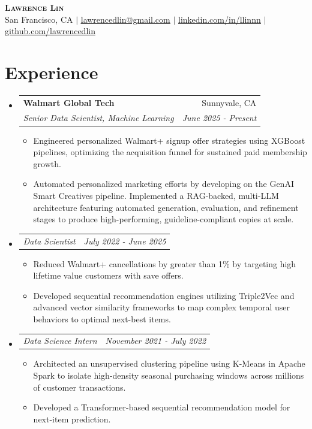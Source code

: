 \documentclass[letterpaper,11pt]{article}
\makeatletter
\newcommand{\resumeItem}[1]{
  \item\small{
    {#1 \vspace{-2pt}}
  }
}
\newcommand{\resumeSubheading}[4]{
  \vspace{-2pt}\item
    \begin{tabular*}{0.97\textwidth}[t]{l@{\extracolsep{\fill}}r}
      \textbf{#1} & #2 \\
      \textit{\small#3} & \textit{\small #4} \\
    \end{tabular*}\vspace{-8pt}
}
\newcommand{\resumeSubHeadingListStart}{\begin{itemize}[leftmargin=0.15in, label={}]}
\newcommand{\resumeSubHeadingListEnd}{\end{itemize}}
\newcommand{\resumeItemListStart}{\begin{itemize}}
\newcommand{\resumeItemListEnd}{\end{itemize}\vspace{-5pt}}
\newcommand{\resumeSubSubheading}[2]{
    \item
    \begin{tabular*}{0.97\textwidth}{l@{\extracolsep{\fill}}r}
      \textit{\small#1} & \textit{\small #2} \\
    \end{tabular*}\vspace{-5pt}
}
\makeatother
\begin{document}
\begin{center}
    \textbf{\huge \scshape Lawrence Lin} \\ \vspace{1pt}
    \small San Francisco, CA $|$
   \href{mailto:lawrencedlin@gmail.com}{\color{blue}\underline{lawrencedlin@gmail.com}} $|$ 
    \href{https://linkedin.com/in/llinnn}{\color{blue}\underline{linkedin.com/in/llinnn}} $|$
    \href{https://github.com/lawrencedlin}{\color{blue}\underline{github.com/lawrencedlin}}
\end{center}

\section{Experience}
  \resumeSubHeadingListStart
  
    \resumeSubheading
      {Walmart Global Tech}{Sunnyvale, CA}
      {Senior Data Scientist, Machine Learning}{June 2025 - Present}
      \resumeItemListStart
        \resumeItem{Engineered personalized Walmart+ signup offer strategies using XGBoost pipelines, optimizing the acquisition funnel for sustained paid membership growth.}
        \resumeItem{Automated personalized marketing efforts by developing on the GenAI Smart Creatives pipeline. Implemented a RAG-backed, multi-LLM architecture featuring automated generation, evaluation, and refinement stages to produce high-performing, guideline-compliant copies at scale.}
      \resumeItemListEnd

    \resumeSubSubheading
      {Data Scientist}{July 2022 - June 2025}
      \resumeItemListStart
        \resumeItem{Reduced Walmart+ cancellations by greater than 1\% by targeting high lifetime value customers with save offers.}
        \resumeItem{Developed sequential recommendation engines utilizing Triple2Vec and advanced vector similarity frameworks to map complex temporal user behaviors to optimal next-best items.}
      \resumeItemListEnd

    \resumeSubSubheading
      {Data Science Intern}{November 2021 - July 2022}
      \resumeItemListStart
        \resumeItem{Architected an unsupervised clustering pipeline using K-Means in Apache Spark to isolate high-density seasonal purchasing windows across millions of customer transactions.}
        \resumeItem{Developed a Transformer-based sequential recommendation model for next-item prediction.}
      \resumeItemListEnd

  \resumeSubHeadingListEnd
 
\end{document}
